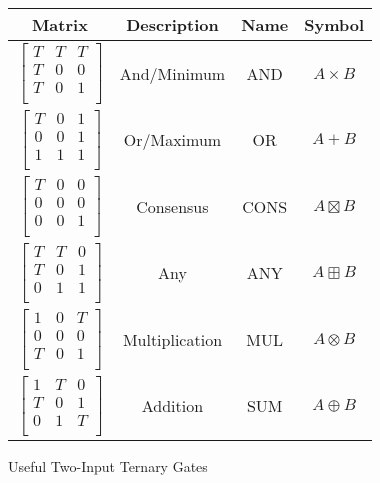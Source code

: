 \documentclass[12pt]{article}
\begin{document}
\begin{figure}[h]
    \centering
    \begin{tabular}{c|c|c|c}
        Matrix & Description & Name & Symbol \\
        \hline
        $\begin{bmatrix}T & T & T \\ T & 0 & 0 \\ T & 0 & 1 \\\end{bmatrix}$ & And/Minimum & AND & $A \times B$ \\
        $\begin{bmatrix}T & 0 & 1 \\ 0 & 0 & 1 \\ 1 & 1 & 1 \\\end{bmatrix}$ & Or/Maximum & OR & $A + B$ \\
        $\begin{bmatrix}T & 0 & 0 \\ 0 & 0 & 0 \\ 0 & 0 & 1 \\\end{bmatrix}$ & Consensus & CONS & $A \boxtimes B$ \\
        $\begin{bmatrix}T & T & 0 \\ T & 0 & 1 \\ 0 & 1 & 1 \\\end{bmatrix}$ & Any & ANY & $A \boxplus B$ \\
        $\begin{bmatrix}1 & 0 & T \\ 0 & 0 & 0 \\ T & 0 & 1 \\\end{bmatrix}$ & Multiplication & MUL & $A \otimes B$ \\
        $\begin{bmatrix}1 & T & 0 \\ T & 0 & 1 \\ 0 & 1 & T \\\end{bmatrix}$ & Addition & SUM & $A \oplus B$ \\
    \end{tabular}
    \caption{Useful Two-Input Ternary Gates}
    \label{fig:two_value_ter_gates}
\end{figure}
\end{document}
